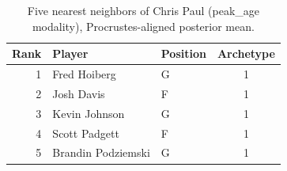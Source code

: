 \begin{table}[htbp]
  \centering\small
  \begin{tabular}{rllc}
    \toprule
    Rank & Player & Position & Archetype \\
    \midrule
    1 & Fred Hoiberg & G & 1 \\
    2 & Josh Davis & F & 1 \\
    3 & Kevin Johnson & G & 1 \\
    4 & Scott Padgett & F & 1 \\
    5 & Brandin Podziemski & G & 1 \\
    \bottomrule
  \end{tabular}
  \caption{Five nearest neighbors of Chris Paul (peak_age modality), Procrustes-aligned posterior mean.}
  \label{tab:Chris_Paul_neighbors_peak_age}
\end{table}

